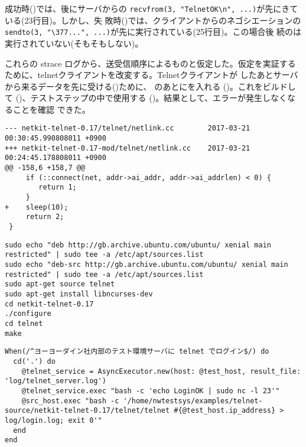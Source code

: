 成功時()では、後にサーバからの
\verb|recvfrom(3, "TelnetOK\n", ...)|が先にきている(23行目)。しかし、失
敗時()では、クライアントからのネゴシエーションの
\verb|sendto(3, "\377...", ...)|が先に実行されている(25行目)。この場合後
続のは実行されていない(そもそもしない)。

これらの strace ログから、送受信順序によるものと仮定した。仮定を実証する
ために、telnetクライアントを改変する。Telnetクライアントが
したあとサーバから来るデータを先に受ける()ために、
のあとにを入れる
()。これをビルドして
()、テストステップの中で使用する
()。結果として、エラーが発生しなくなることを確認
できた。

\begin{lstlisting}[caption=telnetクライアント改変,label=lst:modified-telnet-client]
--- netkit-telnet-0.17/telnet/netlink.cc        2017-03-21 00:30:45.990808011 +0900
+++ netkit-telnet-0.17-mod/telnet/netlink.cc    2017-03-21 00:24:45.178808011 +0900
@@ -158,6 +158,7 @@
     if (::connect(net, addr->ai_addr, addr->ai_addrlen) < 0) {
        return 1;
     }
+    sleep(10);
     return 2;
 }
\end{lstlisting}

\begin{lstlisting}[caption=telnetクライアントのビルド手順,label=lst:howto-build-telnet]
sudo echo "deb http://gb.archive.ubuntu.com/ubuntu/ xenial main restricted" | sudo tee -a /etc/apt/sources.list
sudo echo "deb-src http://gb.archive.ubuntu.com/ubuntu/ xenial main restricted" | sudo tee -a /etc/apt/sources.list
sudo apt-get source telnet
sudo apt-get install libncurses-dev
cd netkit-telnet-0.17
./configure
cd telnet
make
\end{lstlisting}

\begin{lstlisting}[caption=改変telnetクライアントの使用,label=lst:telnet-step]
When(/^ヨーヨーダイン社内部のテスト環境サーバに telnet でログイン$/) do
  cd('.') do
    @telnet_service = AsyncExecutor.new(host: @test_host, result_file: 'log/telnet_server.log')
    @telnet_service.exec "bash -c 'echo LoginOK | sudo nc -l 23'"
    @src_host.exec "bash -c '/home/nwtestsys/examples/telnet-source/netkit-telnet-0.17/telnet/telnet #{@test_host.ip_address} > log/login.log; exit 0'"
  end
end
\end{lstlisting}

